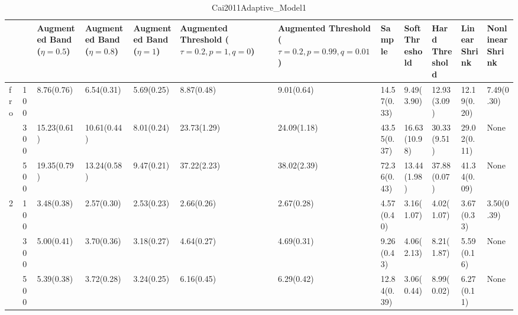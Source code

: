 \begin{table}[htbp]
\centering
\caption{Cai2011Adaptive_Model1}
\label{my label}
\begin{tabular}{ll|p{2cm}p{2cm}p{2cm}p{2cm}p{2cm}p{2cm}p{2cm}p{2cm}p{2cm}p{2cm}}
\toprule
  &     & Augmented Band ($\eta=0.5$) & Augmented Band ($\eta=0.8$) & Augmented Band ($\eta=1$) & Augmented Threshold ($\tau=0.2, p=1, q=0$) & Augmented Threshold ($\tau=0.2, p=0.99, q=0.01$) &       Sample & Soft Threshold & Hard Threshold & Linear Shrink & Nonlinear Shrink \\
\midrule
fro & 100 &                  8.76(0.76) &                  6.54(0.31) &                5.69(0.25) &                                 8.87(0.48) &                                       9.01(0.64) &  14.57(0.33) &     9.49(3.90) &    12.93(3.09) &   12.19(0.20) &       7.49(0.30) \\
  & 300 &                 15.23(0.61) &                 10.61(0.44) &                8.01(0.24) &                                23.73(1.29) &                                      24.09(1.18) &  43.55(0.37) &   16.63(10.98) &    30.33(9.51) &   29.02(0.11) &             None \\
  & 500 &                 19.35(0.79) &                 13.24(0.58) &                9.47(0.21) &                                37.22(2.23) &                                      38.02(2.39) &  72.36(0.43) &    13.44(1.98) &    37.88(0.07) &   41.34(0.09) &             None \\
2 & 100 &                  3.48(0.38) &                  2.57(0.30) &                2.53(0.23) &                                 2.66(0.26) &                                       2.67(0.28) &   4.57(0.40) &     3.16(1.07) &     4.02(1.07) &    3.67(0.33) &       3.50(0.39) \\
  & 300 &                  5.00(0.41) &                  3.70(0.36) &                3.18(0.27) &                                 4.64(0.27) &                                       4.69(0.31) &   9.26(0.43) &     4.06(2.13) &     8.21(1.87) &    5.59(0.16) &             None \\
  & 500 &                  5.39(0.38) &                  3.72(0.28) &                3.24(0.25) &                                 6.16(0.45) &                                       6.29(0.42) &  12.84(0.39) &     3.06(0.44) &     8.99(0.02) &    6.27(0.11) &             None \\
\bottomrule
\end{tabular}
\end{table}
